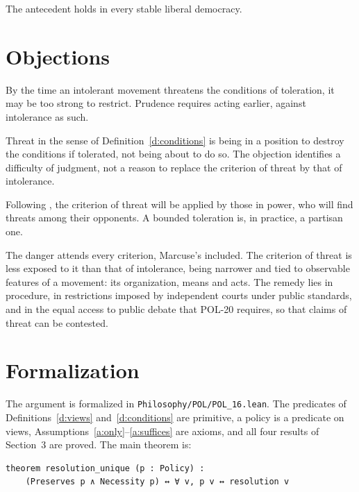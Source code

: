 \documentclass{situationist-preprint}
\begin{document}
The antecedent holds in every stable liberal democracy.

\section{Objections}

\begin{objection}
By the time an intolerant movement threatens the conditions of toleration, it may be too strong to restrict. Prudence requires acting earlier, against intolerance as such.
\end{objection}

\begin{reply}
Threat in the sense of Definition~\ref{d:conditions} is being in a position to destroy the conditions if tolerated, not being about to do so. The objection identifies a difficulty of judgment, not a reason to replace the criterion of threat by that of intolerance.
\end{reply}

\begin{objection}[Partisanship]
Following \citet{Marcuse1965}, the criterion of threat will be applied by those in power, who will find threats among their opponents. A bounded toleration is, in practice, a partisan one.
\end{objection}

\begin{reply}
The danger attends every criterion, Marcuse's included. The criterion of threat is less exposed to it than that of intolerance, being narrower and tied to observable features of a movement: its organization, means and acts. The remedy lies in procedure, in restrictions imposed by independent courts under public standards, and in the equal access to public debate that POL-20 requires, so that claims of threat can be contested.
\end{reply}


\section{Formalization}

The argument is formalized in \nolinkurl{Philosophy/POL/POL_16.lean}. The predicates of Definitions~\ref{d:views} and~\ref{d:conditions} are primitive, a policy is a predicate on views, Assumptions~\ref{a:only}--\ref{a:suffices} are axioms, and all four results of Section~3 are proved. The main theorem is:

\begin{lstlisting}
theorem resolution_unique (p : Policy) :
    (Preserves p ∧ Necessity p) ↔ ∀ v, p v ↔ resolution v
\end{lstlisting}
\end{document}

